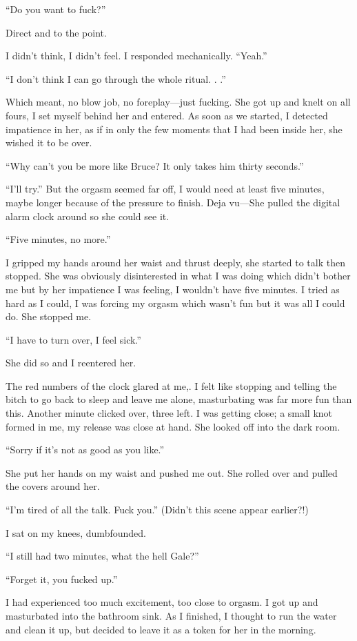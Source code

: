 ``Do you want to fuck?''

Direct and to the point.

I didn't think, I didn't feel. I responded mechanically. ``Yeah.''

``I don't think I can go through the whole ritual. . .''

Which meant, no blow job, no foreplay---just fucking. She got up and
knelt on all fours, I set myself behind her and entered. As soon as we
started, I detected impatience in her, as if in only the few moments
that I had been inside her, she wished it to be over.

``Why can't you be more like Bruce? It only takes him thirty seconds.''

``I'll try.'' But the orgasm seemed far off, I would need at least five
minutes, maybe longer because of the pressure to finish. Deja vu---She
pulled the digital alarm clock around so she could see it.

``Five minutes, no more.''

I gripped my hands around her waist and thrust deeply, she started to
talk then stopped. She was obviously disinterested in what I was doing
which didn't bother me but by her impatience I was feeling, I wouldn't
have five minutes. I tried as hard as I could, I was forcing my orgasm
which wasn't fun but it was all I could do. She stopped me.

``I have to turn over, I feel sick.''

She did so and I reentered her.

The red numbers of the clock glared at me,. I felt like stopping and
telling the bitch to go back to sleep and leave me alone, masturbating
was far more fun than this. Another minute clicked over, three left. I
was getting close; a small knot formed in me, my release was close at
hand. She looked off into the dark room.

``Sorry if it's not as good as you like.''

She put her hands on my waist and pushed me out. She rolled over and
pulled the covers around her.

``I'm tired of all the talk. Fuck you.'' (Didn't this scene appear
earlier?!)

I sat on my knees, dumbfounded.

``I still had two minutes, what the hell Gale?''

``Forget it, you fucked up.''

I had experienced too much excitement, too close to orgasm. I got up and
masturbated into the bathroom sink. As I finished, I thought to run the
water and clean it up, but decided to leave it as a token for her in the
morning.

